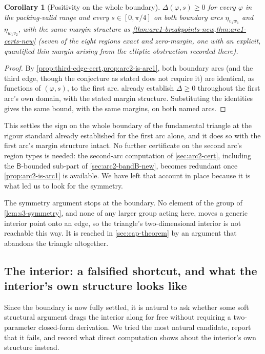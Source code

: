 \documentclass[11pt,reqno]{amsart}
\renewcommand{\_}{\origunderscore\allowbreak}
\numberwithin{equation}{section}
\theoremstyle{plain}
\newtheorem{cor}[thm]{Corollary}
\theoremstyle{definition}
\theoremstyle{remark}
\newcommand{\tilt}{\varphi}                  %
\newcommand{\arcp}{s}                        %
\newcommand{\dev}{\eta}                      %
\newcommand{\defect}{\Delta}                 %
\begin{document}
\begin{cor}[Positivity on the whole boundary]\label{cor:restated-conjecture-holds}
$\defect(\tilt,\arcp)\ge0$ for every $\tilt$ in the packing-valid range
and every $\arcp\in[0,\pi/4]$ on both boundary arcs $\dev_{v_1w_1}$ and
$\dev_{w_1v_2}$, with the same margin structure as
\cref{thm:arc1-breakpoints-new,thm:arc1-certs-new} (seven of the eight
regions exact and zero-margin, one with an explicit, quantified thin
margin arising from the elliptic obstruction recorded there).
\end{cor}

\begin{proof}
By \cref{prop:third-edge-cert,prop:arc2-is-arc1}, both boundary arcs
(and the third edge, though the conjecture as stated does not require
it) are identical, as functions of $(\tilt,\arcp)$, to the first arc.
 already establish
$\defect\ge0$ throughout the first arc's own domain, with the stated
margin structure. Substituting the identities gives the same bound,
with the same margins, on both named arcs.
\end{proof}

This settles the sign on the whole boundary of the fundamental
triangle at the rigour standard already established for the first arc
alone, and it does so with the first arc's margin structure intact. No
further certificate on the second arc's region types is needed: the
second-arc computation of \cref{sec:arc2-cert}, including the
$\mathsf B$-bounded sub-part of \cref{sec:arc2-bandB-new}, becomes
redundant once \cref{prop:arc2-is-arc1} is available. We have left that
account in place because it is what led us to look for the symmetry.

The symmetry argument stops at the boundary. No element of the group of
\cref{lem:s3-symmetry}, and none of any larger group acting here, moves
a generic interior point onto an edge, so the triangle's
two-dimensional interior is not reachable this way. It is reached in
\cref{sec:cap-theorem} by an argument that abandons the triangle
altogether.

\subsection{The interior: a falsified shortcut, and what the interior's own structure looks like}\label{sec:interior-structure}

Since the boundary is now fully settled, it is natural to ask whether
some soft structural argument drags the interior along for free without
requiring a two-parameter closed-form derivation. We tried the
most natural candidate, report that it fails, and record what
direct computation shows about the interior's own structure instead.
\end{document}
